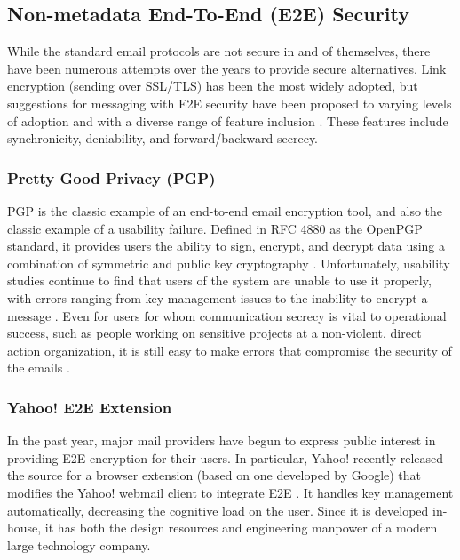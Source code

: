 \documentclass[pageno]{jpaper}
\begin{document}
\subsection{Non-metadata End-To-End (E2E) Security}
While the standard email protocols are not secure in and of themselves, there have been numerous attempts over the years to provide secure alternatives. Link encryption (sending over SSL/TLS) has been the most widely adopted, but suggestions for messaging with E2E security have been proposed to varying levels of adoption and with a diverse range of feature inclusion \cite{unger2015sok}. These features include synchronicity, deniability, and forward/backward secrecy.


\subsubsection{Pretty Good Privacy (PGP)}
PGP is the classic example of an end-to-end email encryption tool, and also the classic example of a usability failure. Defined in RFC 4880 as the OpenPGP standard, it provides users the ability to sign, encrypt, and decrypt data using a combination of symmetric and public key cryptography \cite{callas2007openpgp}. Unfortunately, usability studies continue to find that users of the system are unable to use it properly, with errors ranging from key management issues to the inability to encrypt a message \cite{whitten1999johnny} \cite{sheng2006johnny}. Even for users for whom communication secrecy is vital to operational success, such as people working on sensitive projects at a non-violent, direct action organization, it is still easy to make errors that compromise the security of the emails \cite{gaw2006secrecy}.

\subsubsection{Yahoo! E2E Extension}
In the past year, major mail providers have begun to express public interest in providing E2E encryption for their users. In particular, Yahoo! recently released the source for a browser extension (based on one developed by Google) that modifies the Yahoo! webmail client to integrate E2E \cite{yahooe2e}. It handles key management automatically, decreasing the cognitive load on the user. Since it is developed in-house, it has both the design resources and engineering manpower of a modern large technology company.
\end{document}

